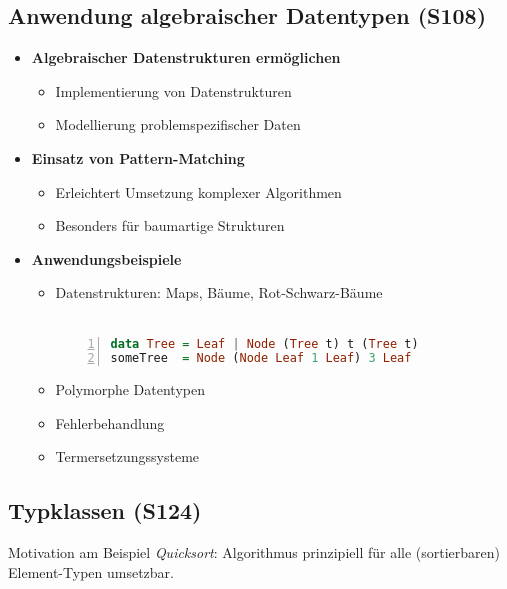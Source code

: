 \subsection{Anwendung algebraischer Datentypen (S108)}
\begin{itemize}
	\item \textbf{Algebraischer Datenstrukturen ermöglichen}
	\begin{itemize}
		\item Implementierung von Datenstrukturen
		\item Modellierung problemspezifischer Daten
	\end{itemize}
	\item \textbf{Einsatz von Pattern-Matching}
	\begin{itemize}
		\item Erleichtert Umsetzung komplexer Algorithmen
		\item Besonders für baumartige Strukturen
	\end{itemize}
	\item \textbf{Anwendungsbeispiele}
	\begin{itemize}
		\item Datenstrukturen: Maps, Bäume, Rot-Schwarz-Bäume \\\\
		\begin{minipage}{\linewidth}
		\begin{lstlisting}[frame=single,numbers=left,mathescape,language=Haskell]
data Tree = Leaf | Node (Tree t) t (Tree t)
someTree  = Node (Node Leaf 1 Leaf) 3 Leaf
		\end{lstlisting}
		\end{minipage}
		\item Polymorphe Datentypen
		\item Fehlerbehandlung
		\item Termersetzungssysteme
	\end{itemize}
\end{itemize}


\subsection{Typklassen (S124)}
Motivation am Beispiel \textit{Quicksort}: Algorithmus prinzipiell für alle (sortierbaren) Element-Typen umsetzbar.

